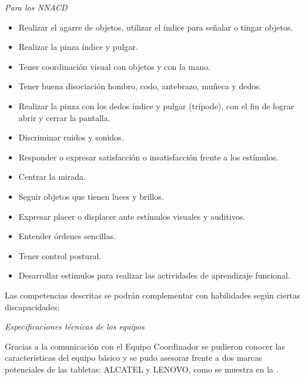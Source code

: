 \documentclass[spanish]{textolivre}
\begin{document}
\textit{Para los NNACD}

\begin{itemize}
    \item  Realizar el agarre de objetos, utilizar el índice para señalar o tingar objetos.
    \item Realizar la pinza índice y pulgar.
    \item Tener coordinación visual con objetos y con la mano.
    \item Tener buena disociación hombro, codo, antebrazo, muñeca y dedos.
    \item Realizar la pinza con los dedos índice y pulgar (trípode), con el fin de lograr abrir y cerrar la pantalla.
    \item Discriminar ruidos y sonidos.
    \item Responder o expresar satisfacción o insatisfacción frente a los estímulos.
    \item Centrar la mirada.
    \item Seguir objetos que tienen luces y brillos.
    \item Expresar placer o displacer ante estímulos visuales y auditivos.
    \item Entender órdenes sencillas.
    \item Tener control postural.
    \item Desarrollar estímulos para realizar las actividades de aprendizaje funcional.
\end{itemize}
    
Las competencias descritas se podrán complementar con habilidades según ciertas discapacidades:

\textit{Especificaciones técnicas de los equipos}

Gracias a la comunicación con el Equipo Coordinador se pudieron conocer las características del equipo básico y se pudo asesorar frente a dos marcas potenciales de las tabletas: ALCATEL y LENOVO, como se muestra en la .
\end{document}
